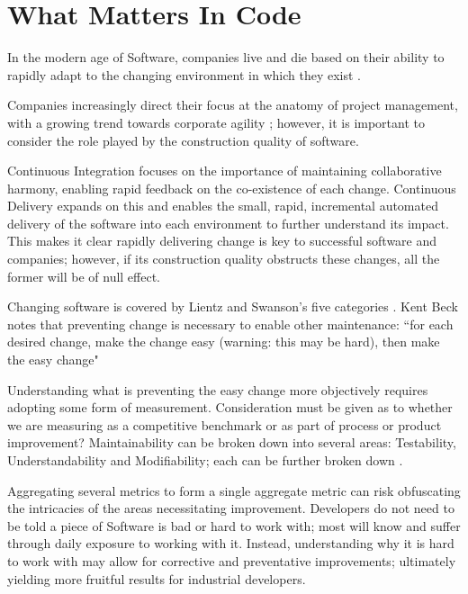 \section{What Matters In Code}

In the modern age of Software, companies live and die based on their ability to rapidly adapt to the changing environment in which they exist \parencite[Chapter~1]{kersten_2018}.

Companies increasingly direct their focus at the anatomy of project management, with a growing trend towards corporate agility \parencite{stateOfAgile_2019}; however, it is important to consider the role played by the construction quality of software.

Continuous Integration \parencite{duvall2007continuous} focuses on the importance of maintaining collaborative harmony, enabling rapid feedback on the co-existence of each change. Continuous Delivery \parencite{humble_farley_2010} expands on this and enables the small, rapid, incremental automated delivery of the software into each environment to further understand its impact. This makes it clear rapidly delivering change is key to successful software and companies; however, if its construction quality obstructs these changes, all the former will be of null effect.

Changing software is covered by Lientz and Swanson's five categories \parencite*{lientz1980software}. Kent Beck notes that preventing change is necessary to enable other maintenance: ``for each desired change, make the change easy (warning: this may be hard), then make the easy change" \parencite{beck_2012_easychange}

Understanding what is preventing the easy change more objectively requires adopting some form of measurement. Consideration must be given as to whether we are measuring as a competitive benchmark or as part of process or product improvement? Maintainability can be broken down into several areas: Testability, Understandability and Modifiability; each can be further broken down \parencite{Boehm:1976:QES:800253.807736}.

Aggregating several metrics to form a single aggregate metric can risk obfuscating the intricacies of the areas necessitating improvement. Developers do not need to be told a piece of Software is bad or hard to work with; most will know and suffer through daily exposure to working with it. Instead, understanding why it is hard to work with may allow for corrective and preventative improvements; ultimately yielding more fruitful results for industrial developers.

